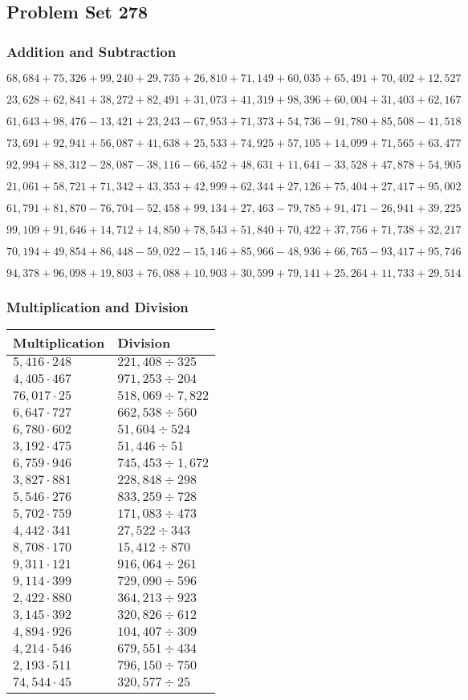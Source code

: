 \hypertarget{problem-set-278}{%
\subsection{Problem Set 278}\label{problem-set-278}}

\hypertarget{addition-and-subtraction}{%
\subsubsection{Addition and
Subtraction}\label{addition-and-subtraction}}

\(68,684+75,326+99,240+29,735+26,810+71,149+60,035+65,491+70,402+12,527\)

\(23,628+62,841+38,272+82,491+31,073+41,319+98,396+60,004+31,403+62,167\)

\(61,643+98,476-13,421+23,243-67,953+71,373+54,736-91,780+85,508-41,518\)

\(73,691+92,941+56,087+41,638+25,533+74,925+57,105+14,099+71,565+63,477\)

\(92,994+88,312-28,087-38,116-66,452+48,631+11,641-33,528+47,878+54,905\)

\(21,061+58,721+71,342+43,353+42,999+62,344+27,126+75,404+27,417+95,002\)

\(61,791+81,870-76,704-52,458+99,134+27,463-79,785+91,471-26,941+39,225\)

\(99,109+91,646+14,712+14,850+78,543+51,840+70,422+37,756+71,738+32,217\)

\(70,194+49,854+86,448-59,022-15,146+85,966-48,936+66,765-93,417+95,746\)

\(94,378+96,098+19,803+76,088+10,903+30,599+79,141+25,264+11,733+29,514\)

\hypertarget{multiplication-and-division}{%
\subsubsection{Multiplication and
Division}\label{multiplication-and-division}}

\begin{longtable}[]{@{}ll@{}}
\toprule
Multiplication & Division\tabularnewline
\midrule
\endhead
\(5,416\cdot248\) & \(221,408÷ 325\)\tabularnewline
\(4,405\cdot467\) & \(971,253÷204\)\tabularnewline
\(76,017\cdot25\) & \(518,069÷7,822\)\tabularnewline
\(6,647\cdot727\) & \(662,538÷560\)\tabularnewline
\(6,780\cdot602\) & \(51,604÷524\)\tabularnewline
\(3,192\cdot475\) & \(51,446÷51\)\tabularnewline
\(6,759\cdot946\) & \(745,453÷1,672\)\tabularnewline
\(3,827\cdot881\) & \(228,848÷298\)\tabularnewline
\(5,546\cdot276\) & \(833,259÷728\)\tabularnewline
\(5,702\cdot759\) & \(171,083÷473\)\tabularnewline
\(4,442\cdot341\) & \(27,522÷343\)\tabularnewline
\(8,708\cdot170\) & \(15,412÷870\)\tabularnewline
\(9,311\cdot121\) & \(916,064÷261\)\tabularnewline
\(9,114\cdot399\) & \(729,090÷596\)\tabularnewline
\(2,422\cdot880\) & \(364,213÷923\)\tabularnewline
\(3,145\cdot392\) & \(320,826÷612\)\tabularnewline
\(4,894\cdot926\) & \(104,407÷309\)\tabularnewline
\(4,214\cdot546\) & \(679,551÷434\)\tabularnewline
\(2,193\cdot511\) & \(796,150÷750\)\tabularnewline
\(74,544\cdot45\) & \(320,577÷25\)\tabularnewline
\bottomrule
\end{longtable}
